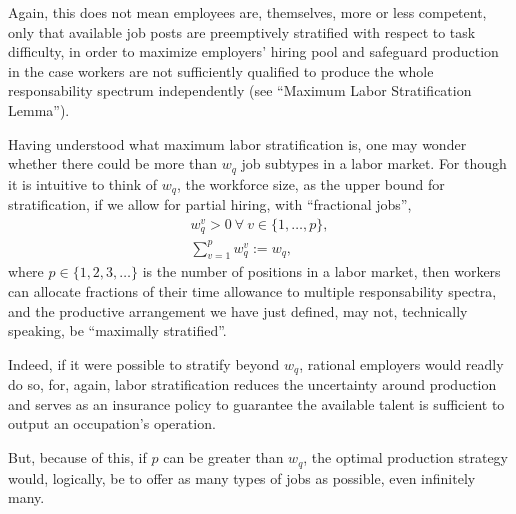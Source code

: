 \documentclass[hidelinks, nonatbib]{elsarticle}
\begin{document}
\begin{definition}
    Again, this does not mean employees are, themselves, more or less competent, only that available job posts are preemptively stratified with respect to task difficulty, in order to maximize employers' hiring pool and safeguard production in the case workers are not sufficiently qualified to produce the whole responsability spectrum independently (see ``Maximum Labor Stratification Lemma'').    
\end{definition}
Having understood what maximum labor stratification is, one may wonder whether there could be more than $w_q$ job subtypes in a labor market. For though it is intuitive to think of $w_q$, the workforce size, as the upper bound for stratification, if we allow for partial hiring, with ``fractional jobs'',
\begin{gather}
w_{q}^{v} 
> 0
\
\forall
\
v \in \{1, \dots, p\}
,
\\
\sum_{v=1}^{p}
w_{q}^{v}
:=
w_q
,
\end{gather}
where $p \in \{1, 2, 3, \dots\}$ is the number of positions in a labor market, then workers can allocate fractions of their time allowance to multiple responsability spectra, and the productive arrangement we have just defined, may not, technically speaking, be ``maximally stratified''. 

Indeed, if it were possible to stratify beyond $w_q$, rational employers would readly do so, for, again, labor stratification reduces the uncertainty around production and serves as an insurance policy to guarantee the available talent is sufficient to output an occupation's operation.

But, because of this, if $p$ can be greater than $w_q$, the optimal production strategy would, logically, be to offer as many types of jobs as possible, even infinitely many.
\end{document}
